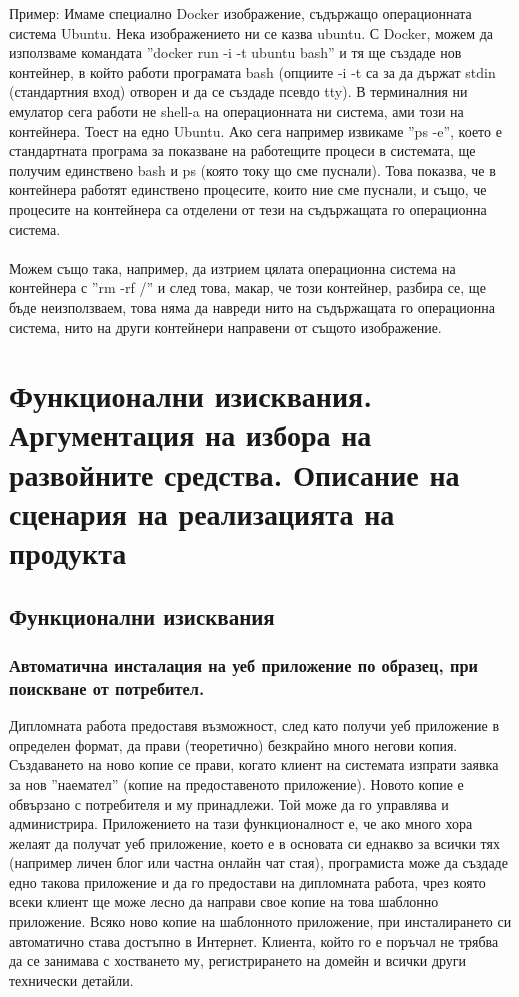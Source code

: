 \documentclass[pdftex,14pt,a4paper]{extreport}
\begin{document}
Пример: Имаме специално Docker изображение, съдържащо операционната система Ubuntu. Нека изображението ни се казва ubuntu. С Docker, можем да използваме командата ''docker run -i -t ubuntu bash'' и тя ще създаде нов контейнер, в който работи програмата bash (опциите -i -t са за да държат stdin (стандартния вход) отворен и да се създаде псевдо tty). В терминалния ни емулатор сега работи не shell-a на операционната ни система, ами този на контейнера. Тоест на едно Ubuntu. Ако сега например извикаме ''ps -e'', което е стандартната програма за показване на работещите процеси в системата, ще получим единствено bash и ps (която току що сме пуснали). Това показва, че в контейнера работят единствено процесите, които ние сме пуснали, и също, че процесите на контейнера са отделени от тези на съдържащата го операционна система.
\\\\
Можем също така, например, да изтрием цялата операционна система на контейнера с ''rm -rf /'' и след това, макар, че този контейнер, разбира се, ще бъде неизползваем, това няма да навреди нито на съдържащата го операционна система, нито на други контейнери направени от същото изображение.
\newpage
\clearpage
\chapter {Функционални изисквания. Аргументация на избора на развойните средства. Описание на сценария на реализацията на продукта}
\section {Функционални изисквания}
\subsection {Автоматична инсталация на уеб приложение по образец, при поискване от потребител.}
Дипломната работа предоставя възможност, след като получи уеб приложение в определен формат, да прави (теоретично) безкрайно много негови копия. Създаването на ново копие се прави, когато клиент на системата изпрати заявка за нов ''наемател'' (копие на предоставеното приложение). Новото копие е обвързано с потребителя и му принадлежи. Той може да го управлява и администрира. Приложението на тази функционалност е, че ако много хора желаят да получат уеб приложение, което е в основата си еднакво за всички тях (например личен блог или частна онлайн чат стая), програмиста може да създаде едно такова приложение и да го предостави на дипломната работа, чрез която всеки клиент ще може лесно да направи свое копие на това шаблонно приложение. Всяко ново копие на шаблонното приложение, при инсталирането си автоматично става достъпно в Интернет. Клиента, който го е поръчал не трябва да се занимава с хостването му, регистрирането на домейн и всички други технически детайли.
\end{document}

